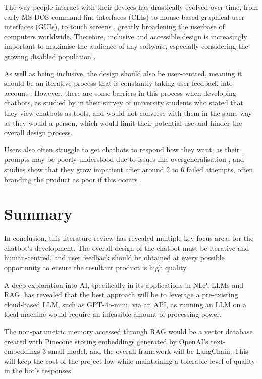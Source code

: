 The way people interact with their devices has drastically evolved over time, from early MS-DOS command-line 
interfaces (CLIs) to mouse-based graphical user interfaces (GUIs), to touch screens \autocite{kotian_systematic_2024}, greatly broadening
the userbase of computers worldwide. Therefore, inclusive and accessible design is increasingly important to maximise the audience of any software,
especially considering the growing disabled population \autocite{putnam_how_2012}. 

As well as being inclusive, the design 
should also be user-centred, meaning it should be an iterative process that is constantly taking user feedback 
into account \autocite{chammas_closer_2015}. However, there are some barriers in this process when developing 
chatbots, as studied by \textcite{clark_what_2019} in their survey of university students who stated that they view 
chatbots as tools, and would not converse with them in the same way as they would a person, which would 
limit their potential use and hinder the overall design process. 

Users also often struggle to get chatbots to respond how they want, as their prompts may be poorly understood
due to issues like overgeneralisation \autocite{zamfirescu-pereira_why_2023}, and studies show that they
grow impatient after around 2 to 6 failed attempts, often branding the product as poor if this occurs \autocite{luger_like_2016}.

\section{Summary}

In conclusion, this literature review has revealed multiple key focus areas for the chatbot's development. 
The overall design of the chatbot must be iterative and human-centred, and user feedback should 
be obtained at every possible opportunity to ensure the resultant product is high quality.

A deep exploration into AI, specifically in its applications in NLP, LLMs and RAG, has revealed that the best approach 
will be to leverage a pre-existing cloud-based LLM, such as GPT-4o-mini, via an API, as running an LLM on a local machine would 
require an infeasible amount of processing power.

The non-parametric memory accessed through RAG would be a vector database created with Pinecone storing embeddings generated by OpenAI's text-embeddings-3-small 
model, and the overall framework will be LangChain. This will keep the cost of the project low while maintaining a tolerable level of quality in the bot's responses.

\nocite{IBMAIDef}
\nocite{UXDict}
\nocite{ICOAIDef}
\nocite{IBMGenAI}
\nocite{MITGenAI}
\nocite{CloudflareLLM}
\nocite{IBMNLP}
\nocite{aws_what_nodate}
\nocite{databricks_retrieval_2023}
\nocite{elastic_what_nodate}
\nocite{confident_ai_llm_nodate}
\nocite{metaFaissLibraryEfficient2017}